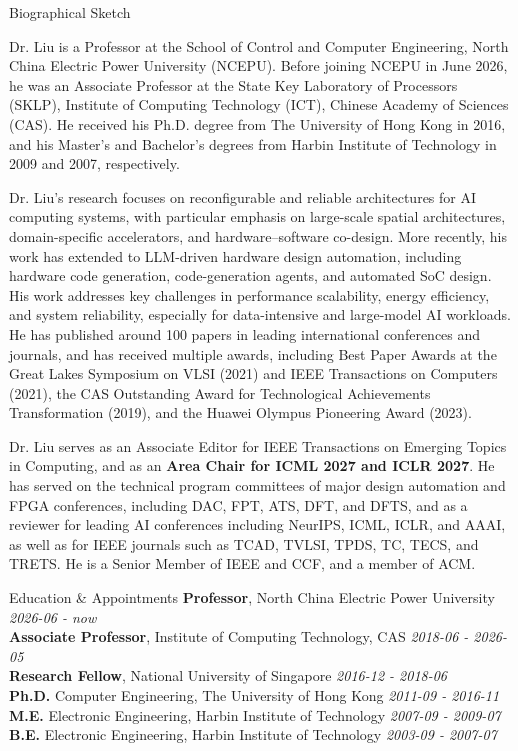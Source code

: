 \documentclass{resume}
\begin{document}
\begin{rSection}{Biographical Sketch}
    \vspace{-1em}
\item Dr. Liu is a Professor at the School of Control and Computer Engineering, North China Electric Power University (NCEPU). Before joining NCEPU in June 2026, he was an Associate Professor at the State Key Laboratory of Processors (SKLP), Institute of Computing Technology (ICT), Chinese Academy of Sciences (CAS). He received his Ph.D. degree from The University of Hong Kong in 2016, and his Master's and Bachelor's degrees from Harbin Institute of Technology in 2009 and 2007, respectively.

Dr. Liu's research focuses on reconfigurable and reliable architectures for AI computing systems, with particular emphasis on large-scale spatial architectures, domain-specific accelerators, and hardware--software co-design. More recently, his work has extended to LLM-driven hardware design automation, including hardware code generation, code-generation agents, and automated SoC design. His work addresses key challenges in performance scalability, energy efficiency, and system reliability, especially for data-intensive and large-model AI workloads. He has published around 100 papers in leading international conferences and journals, and has received multiple awards, including Best Paper Awards at the Great Lakes Symposium on VLSI (2021) and IEEE Transactions on Computers (2021), the CAS Outstanding Award for Technological Achievements Transformation (2019), and the Huawei Olympus Pioneering Award (2023).

Dr. Liu serves as an Associate Editor for IEEE Transactions on Emerging Topics in Computing, and as an \textbf{Area Chair for ICML 2027 and ICLR 2027}. He has served on the technical program committees of major design automation and FPGA conferences, including DAC, FPT, ATS, DFT, and DFTS, and as a reviewer for leading AI conferences including NeurIPS, ICML, ICLR, and AAAI, as well as for IEEE journals such as TCAD, TVLSI, TPDS, TC, TECS, and TRETS. He is a Senior Member of IEEE and CCF, and a member of ACM.

\end{rSection}

\begin{rSection}{Education \& Appointments}
{\textbf{Professor}, North China Electric Power University} \hfill {\em 2026-06 - now} \\
{\textbf{Associate Professor}, Institute of Computing Technology, CAS} \hfill {\em 2018-06 - 2026-05} \\
{\textbf{Research Fellow}, National University of Singapore} \hfill {\em 2016-12 - 2018-06} \\
{\textbf{Ph.D.} Computer Engineering, The University of Hong Kong} \hfill {\em 2011-09 - 2016-11} \\
{\textbf{M.E.} Electronic Engineering, Harbin Institute of Technology} \hfill {\em 2007-09 - 2009-07} \\
{\textbf{B.E.} Electronic Engineering, Harbin Institute of Technology} \hfill {\em 2003-09 - 2007-07} \\
\vspace{-1em}
\end{rSection}
\end{document}
